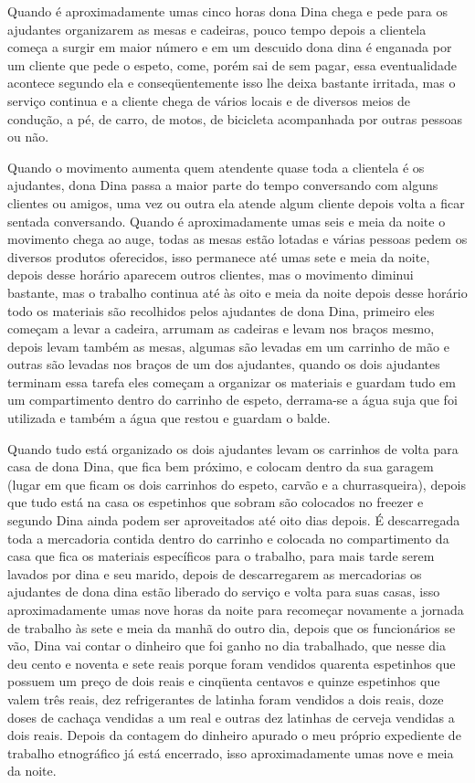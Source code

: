 Quando é aproximadamente umas cinco horas dona Dina chega e pede para os 
ajudantes organizarem as mesas e cadeiras, pouco tempo depois a clientela começa 
a surgir em maior número e em um descuido dona dina é enganada por um cliente 
que pede o espeto, come, porém sai de sem pagar, essa eventualidade acontece 
segundo ela e conseqüentemente isso lhe deixa bastante irritada, mas o serviço 
continua e a cliente chega de vários locais e de diversos meios de condução, a 
pé, de carro, de motos, de bicicleta acompanhada por outras pessoas ou não. 

Quando o movimento aumenta quem atendente quase toda a clientela é os ajudantes, 
dona Dina passa a maior parte do tempo conversando com alguns clientes ou 
amigos, uma vez ou outra ela atende algum cliente depois volta a ficar sentada 
conversando. Quando é aproximadamente umas seis e meia da noite o movimento 
chega ao auge, todas as mesas estão lotadas e várias pessoas pedem os diversos 
produtos oferecidos, isso permanece até umas sete e meia da noite, depois desse 
horário aparecem outros clientes, mas o movimento diminui bastante, mas o 
trabalho continua até às oito e meia da noite depois desse horário todo os 
materiais são recolhidos pelos ajudantes de dona Dina, primeiro eles começam a 
levar a cadeira, arrumam as cadeiras e levam nos braços mesmo, depois levam 
também as mesas, algumas são levadas em um carrinho de mão e outras são levadas 
nos braços de um dos ajudantes, quando os dois ajudantes terminam essa tarefa 
eles começam a organizar os materiais e guardam tudo em um compartimento dentro 
do carrinho de espeto, derrama-se a água suja que foi utilizada e também a água 
que restou e guardam o balde. 

Quando tudo está organizado os dois ajudantes levam os carrinhos de volta para 
casa de dona Dina, que fica bem próximo, e colocam dentro da sua garagem (lugar 
em que ficam os dois carrinhos do espeto, carvão e a churrasqueira), depois que 
tudo está na casa os espetinhos que sobram são colocados no freezer e segundo 
Dina ainda podem ser aproveitados até oito dias depois. É descarregada toda a 
mercadoria contida dentro do carrinho e colocada no compartimento da casa que 
fica os materiais específicos para o trabalho, para mais tarde serem lavados por 
dina e seu marido, depois de descarregarem as mercadorias os ajudantes de dona 
dina estão liberado do serviço e volta para suas casas, isso aproximadamente 
umas nove horas da noite para recomeçar novamente a jornada de trabalho às sete 
e meia da manhã do outro dia, depois que os funcionários se vão, Dina vai contar 
o dinheiro que foi ganho no dia trabalhado, que nesse dia deu cento e noventa e 
sete reais porque foram vendidos quarenta espetinhos que possuem um preço de 
dois reais e cinqüenta centavos e quinze espetinhos que valem três reais, dez 
refrigerantes de latinha foram vendidos a dois reais, doze doses de cachaça 
vendidas a um real e outras dez latinhas de cerveja vendidas a dois reais. 
Depois da contagem do dinheiro apurado o meu próprio expediente de trabalho 
etnográfico já está encerrado, isso aproximadamente umas nove e meia da noite.

